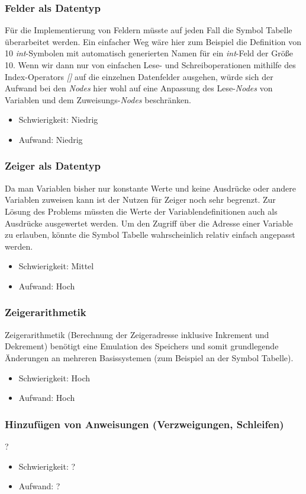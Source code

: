 \documentclass[oneside]{ausarbeitung}
\begin{document}
\subsubsection{Felder als Datentyp}
Für die Implementierung von Feldern müsste auf jeden Fall die Symbol Tabelle überarbeitet werden. Ein einfacher Weg wäre hier zum Beispiel die Definition von 10 \textit{int}-Symbolen mit automatisch generierten Namen für ein \textit{int}-Feld der Größe 10. Wenn wir dann nur von einfachen Lese- und Schreiboperationen mithilfe des Index-Operators \textit{[]} auf die einzelnen Datenfelder ausgehen, würde sich der Aufwand bei den \textit{Nodes} hier wohl auf eine Anpassung des Lese-\textit{Nodes} von Variablen und dem Zuweisungs-\textit{Nodes} beschränken.
\begin{itemize}
\item{Schwierigkeit: Niedrig}
\item{Aufwand: Niedrig}
\end{itemize}
\subsubsection{Zeiger als Datentyp}
Da man Variablen bisher nur konstante Werte und keine Ausdrücke  oder andere Variablen zuweisen kann ist der Nutzen für Zeiger noch sehr begrenzt. Zur Lösung des Problems müssten die Werte der Variablendefinitionen auch als Ausdrücke ausgewertet werden. Um den Zugriff über die Adresse einer Variable zu erlauben, könnte die Symbol Tabelle wahrscheinlich relativ einfach angepasst werden.
\begin{itemize}
\item{Schwierigkeit: Mittel}
\item{Aufwand: Hoch}
\end{itemize}
\subsubsection{Zeigerarithmetik}
Zeigerarithmetik (Berechnung der Zeigeradresse inklusive Inkrement und Dekrement) benötigt eine Emulation des Speichers und somit grundlegende Änderungen an mehreren Basissystemen (zum Beispiel an der Symbol Tabelle).
\begin{itemize}
\item{Schwierigkeit: Hoch}
\item{Aufwand: Hoch}
\end{itemize}
\subsubsection{Hinzufügen von Anweisungen (Verzweigungen, Schleifen)}
?
\begin{itemize}
\item{Schwierigkeit: ?}
\item{Aufwand: ?}
\end{itemize}
\end{document}
